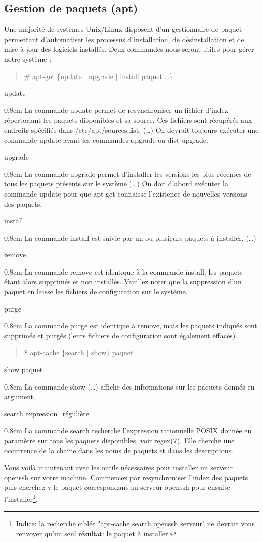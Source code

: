 \documentclass[a4paper,11pt]{article}
\newcommand{\commande}[1] {
    \begin{quote}
    \tt\raggedright #1
    \end{quote}
}
\newcommand{\man}[2]{
    \begin{tcolorbox}[toprule=3mm,width=\textwidth,outer arc=0mm,colbacktitle=grayman,coltitle=black,colback={grayman},colframe={grayman},title={man : \tt #1}]
        \tt\raggedright #2
    \end{tcolorbox}
}
\newcommand{\mandesc}[1]{
    \begin{adjustwidth}{0.8cm}{}
        #1
    \end{adjustwidth}
}
\begin{document}
\subsection{Gestion de paquets (apt)}
\par Une majorité de systèmes Unix/Linux disposent d'un gestionnaire de paquet permettant d'automatiser les processus d'installation, de désinstallation et de mise à jour des logiciels installés. Deux commandes nous seront utiles pour gérer notre système :
\commande{\# apt-get \{update $|$ upgrade $|$ install paquet \ldots\}}
\man{apt-get}{
update
\mandesc{La commande update permet de resynchroniser un fichier d'index répertoriant les paquets disponibles et sa source. Ces fichiers sont récupérés aux endroits spécifiés dans /etc/apt/sources.list. (\ldots) On devrait toujours exécuter une commande update avant les commandes upgrade ou dist-upgrade.}
upgrade
\mandesc{La commande upgrade permet d'installer les versions les plus récentes de tous les paquets présents sur le système (\dots) On doit d'abord exécuter la commande update pour que apt-get connaisse l'existence de nouvelles versions des paquets.}
install
\mandesc{La commande install est suivie par un ou plusieurs paquets à installer. (\ldots)}
remove
\mandesc{La commande remove est identique à la commande install, les paquets étant alors supprimés et non installés. Veuillez noter que la suppression d'un paquet en laisse les fichiers de configuration sur le système.}
purge
\mandesc{La commande purge est identique à remove, mais les paquets indiqués sont supprimés et purgés (leurs fichiers de configuration sont également effacés).}
}
\commande{\$ apt-cache \{search $|$ show\} paquet}
\man{apt-cache}{
show paquet
\mandesc{La commande show (\dots) affiche des informations sur les paquets donnés en argument.}
search expression\_régulière
\mandesc{La commande search recherche l'expression rationnelle POSIX donnée en paramètre sur tous les paquets disponibles, voir regex(7). Elle cherche une occurrence de la chaîne dans les noms de paquets et dans les descriptions.}
}
\par Vous voilà maintenant avec les outils nécessaires pour installer un serveur openssh sur votre machine. Commencez par resynchroniser l'index des paquets puis cherchez-y le paquet correspondant au serveur openssh pour ensuite l'installer\footnote{Indice: la recherche ciblée "apt-cache search openssh serveur" ne devrait vous renvoyer qu'un seul résultat: le paquet à installer.}.
\end{document}
